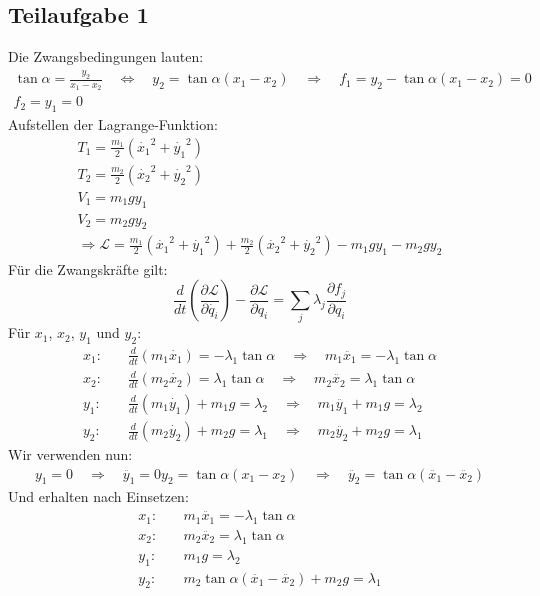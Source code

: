 \documentclass[a4paper,german,12pt,smallheadings]{scrartcl}
\begin{document}
\subsection*{Teilaufgabe 1}
Die Zwangsbedingungen lauten:
\begin{align*}
\tan\alpha=\frac{y_2}{x_1-x_2} \quad \Leftrightarrow \quad y_2=\tan\alpha \left(x_1-x_2\right) \quad \Rightarrow \quad f_1=y_2-\tan\alpha \left(x_1-x_2\right)=0\\
f_2=y_1=0
\end{align*}
Aufstellen der Lagrange-Funktion:
\begin{align*}
T_1=\frac{m_1}{2} \left(\dot{x_1}^2+\dot{y_1}^2\right)\\
T_2=\frac{m_2}{2} \left(\dot{x_2}^2+\dot{y_2}^2\right)\\
V_1=m_1gy_1\\
V_2=m_2gy_2\\
\Rightarrow \mathcal{L}=\frac{m_1}{2} \left(\dot{x_1}^2+\dot{y_1}^2\right)+\frac{m_2}{2} \left(\dot{x_2}^2+\dot{y_2}^2\right)-m_1gy_1-m_2gy_2
\end{align*}
Für die Zwangskräfte gilt:
\begin{equation}
\frac{d}{dt}\left(\frac{\partial \mathcal{L}}{\partial \dot{q_i}}\right)-\frac{\partial \mathcal{L}}{\partial q_i}=\sum\limits_j \lambda_j \frac{\partial f_j}{\partial q_i}
\end{equation}
Für $x_1$, $x_2$, $y_1$ und $y_2$:
\begin{align}
x_1: & \quad \frac{d}{dt} \left(m_1 \dot{x_1}\right)=-\lambda_1 \tan \alpha \quad \Rightarrow \quad m_1 \ddot{x_1}=-\lambda_1 \tan \alpha\\
x_2: & \quad  \frac{d}{dt} \left(m_2 \dot{x_2}\right)=\lambda_1 \tan \alpha \quad \Rightarrow \quad m_2 \ddot{x_2}=\lambda_1 \tan \alpha\\
y_1: & \quad \frac{d}{dt} \left(m_1 \dot{y_1}\right)+m_1g=\lambda_2 \quad \Rightarrow \quad m_1 \ddot{y_1}+m_1g=\lambda_2\\
y_2: & \quad \frac{d}{dt} \left(m_2 \dot{y_2}\right)+m_2g=\lambda_1 \quad \Rightarrow \quad m_2 \ddot{y_2}+m_2g=\lambda_1
\end{align}
Wir verwenden nun:
\begin{align*}
y_1=0 \quad \Rightarrow \quad \ddot{y_1}=0
y_2=\tan \alpha \left(x_1-x_2\right) \quad \Rightarrow \quad \ddot{y_2}=\tan \alpha \left(\ddot{x_1}-\ddot{x_2}\right)
\end{align*}
Und erhalten nach Einsetzen:
\begin{align*}
x_1: & \quad m_1 \ddot{x_1}=-\lambda_1 \tan \alpha\\
x_2: & \quad m_2 \ddot{x_2}=\lambda_1 \tan \alpha\\
y_1: & \quad m_1g=\lambda_2\\
y_2: & \quad m_2 \tan \alpha \left(\ddot{x_1}-\ddot{x_2}\right)+m_2g=\lambda_1
\end{align*}
\end{document}
